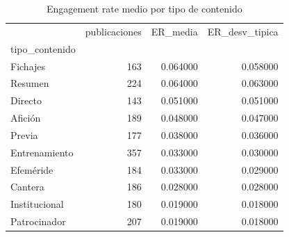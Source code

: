 \begin{table}
\caption{Engagement rate medio por tipo de contenido}
\label{tab:engagement_contenido}
\begin{tabular}{lrrr}
\toprule
 & publicaciones & ER\_media & ER\_desv\_tipica \\
tipo\_contenido &  &  &  \\
\midrule
Fichajes & 163 & 0.064000 & 0.058000 \\
Resumen & 224 & 0.064000 & 0.063000 \\
Directo & 143 & 0.051000 & 0.051000 \\
Afición & 189 & 0.048000 & 0.047000 \\
Previa & 177 & 0.038000 & 0.036000 \\
Entrenamiento & 357 & 0.033000 & 0.030000 \\
Efeméride & 184 & 0.033000 & 0.029000 \\
Cantera & 186 & 0.028000 & 0.028000 \\
Institucional & 180 & 0.019000 & 0.018000 \\
Patrocinador & 207 & 0.019000 & 0.018000 \\
\bottomrule
\end{tabular}
\end{table}
